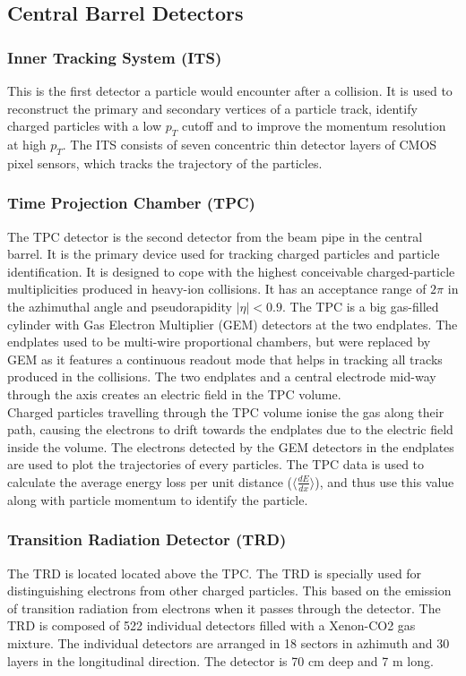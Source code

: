 \documentclass[12pt,a4paper,twoside]{report}
\begin{document}
\subsection{Central Barrel Detectors}
\subsubsection{Inner Tracking System (ITS)}
This is the first detector a particle would encounter after a collision. It is used to reconstruct the primary and secondary vertices of a particle track, identify charged particles with a low $p_T$ cutoff and to improve the momentum resolution at high $p_T$. The ITS consists of seven concentric thin detector layers of CMOS pixel sensors, which tracks the trajectory of the particles. \cite{Ref:ALICE-detectors-ITS}
\subsubsection{Time Projection Chamber (TPC)}
The TPC detector is the second detector from the beam pipe in the central barrel. It is the primary device used for tracking charged particles and particle identification. It is designed to cope with the highest conceivable charged-particle multiplicities produced in heavy-ion collisions. It has an acceptance range of $2\pi$ in the azhimuthal angle and pseudorapidity $|\eta|<0.9$. The TPC is a big gas-filled cylinder with Gas Electron Multiplier (GEM) detectors at the two endplates. The endplates used to be multi-wire proportional chambers, but were replaced by GEM as it features a continuous readout mode that helps in tracking all tracks produced in the collisions. The two endplates and a central electrode mid-way through the axis creates an electric field in the TPC volume.\\
Charged particles travelling through the TPC volume ionise the gas along their path, causing the electrons to drift towards the endplates due to the electric field inside the volume. The electrons detected by the GEM detectors in the endplates are used to plot the trajectories of every particles. The TPC data is used to calculate the average energy loss per unit distance ($\langle\frac{dE}{dx}\rangle$), and thus use this value along with particle momentum to identify the particle. \cite{Ref:ALICE-detectors-TPC}
\subsubsection{Transition Radiation Detector (TRD)}
The TRD is located located above the TPC. The TRD is specially used for distinguishing electrons from other charged particles. This based on the emission of transition radiation from electrons when it passes through the detector. The TRD is composed of 522 individual detectors filled with a Xenon-CO2 gas mixture. The individual detectors are arranged in 18 sectors in azhimuth and 30 layers in the longitudinal direction. The detector is 70 cm deep and 7 m long. \cite{Ref:ALICE-detectors-TRD}
\end{document}
